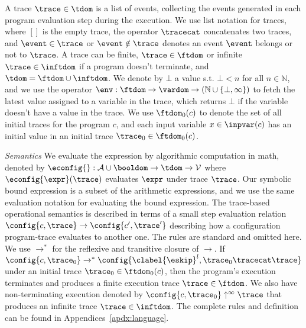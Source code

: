 A trace $\trace \in \tdom$ is a list of events, 
collecting the events generated in each program evaluation step during the execution. 
We use list notation for traces, where $[]$ is the empty trace,
the operator $\tracecat$ concatenates two traces, and $\event \in \trace$ or $\event \notin \trace$ denotes an event $\event$ belongs or not to $\trace$.
{
A trace can be finite, $\trace \in \ftdom$ or infinite $\trace \in \inftdom$ if a program doesn't terminate,
and $\tdom = \ftdom \cup \inftdom$.
}
We denote by $\bot$ a value s.t. $\bot < n $ for all $n \in \mathbb{N}$, and we use the operator $\env: {\ftdom} \to \vardom \to(\mathbb{N} \cup \{\bot, \infty\})$ to fetch the latest value assigned to a variable in the trace, which returns $\bot$ if the variable doesn't have a value in the trace.
We use $\ftdom_0(c)$ to denote the set of all initial traces for the program $c$, and each input variable $x \in \inpvar(c)$ has an initial value in an initial trace $\trace_0 \in \ftdom_0(c)$.

\emph{Semantics}
We evaluate the expression by algorithmic computation in math, denoted by
$\econfig{} : \mathcal{A} \cup \booldom \to \tdom \to \mathcal{V}$ where
$\econfig{\expr}(\trace)$ evaluates $\expr$ under trace $\trace$.
Our symbolic bound expression is a subset of the arithmetic expressions, and we use the same evaluation notation for evaluating the bound expression.
The trace-based operational semantics is described in terms of a small step evaluation relation $\config{c, \trace} \to \config{c', \trace'}$ describing how a configuration program-trace evaluates to another
one.
The rules are standard and omitted here.
We use $\to^*$ for the reflexive and transitive closure of $\to$. 
If $\config{c, \trace_0} \rightarrow^{*} \config{\clabel{\eskip}^l, \trace_0 \tracecat \trace}$ under an initial trace 
$\trace_0 \in \ftdom_0(c)$,
then the program's execution terminates and produces a finite execution trace $\trace \in \ftdom$. We also have non-terminating execution denoted by $\config{c, \trace_0} \uparrow^{\infty} \trace$ that produces an infinite trace $\trace \in \inftdom$. The complete rules and definition can be found in Appendices~\ref{apdx:language}.